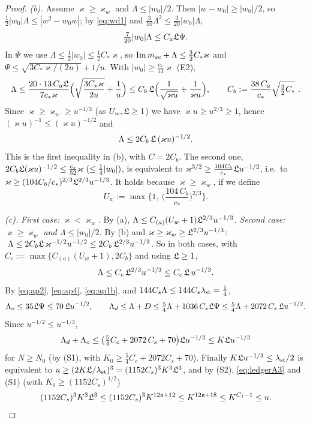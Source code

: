 \begin{proof}
\emph{(b).} Assume $\varkappa\ge\varkappa_w$ and $\Lambda\le|w_0|/2$. Then $|w-w_0|\ge|w_0|/2$, so $\frac12|w_0|\Lambda\le|w^2-w_0w|$; by \eqref{eq:wd1} and $\frac3{10}\Lambda^2\le\frac3{20}|w_0|\Lambda$,
\[
 \tfrac7{20}|w_0|\Lambda\le C_a\mathfrak{L}\Psi .
\]
In $\Psi$ we use $\Lambda\le\frac12|w_0|\le\frac12C_*\varkappa$, so $\operatorname{Im}m_{sc}+\Lambda\le\frac32C_*\varkappa$ and $\Psi\le\sqrt{3C_*\varkappa/(2u)}+1/u$. With $|w_0|\ge\frac{c_*}{13}\varkappa$ (E2),
\[
 \Lambda\le\frac{20\cdot13\,C_a\mathfrak{L}}{7c_*\varkappa}\Big(\sqrt{\frac{3C_*\varkappa}{2u}}+\frac1u\Big)\le C_b\,\mathfrak{L}\Big(\frac1{\sqrt{\varkappa u}}+\frac1{\varkappa u}\Big),\qquad C_b:=\frac{38\,C_a}{c_*}\sqrt{\tfrac32C_*}\ .
\]
Since $\varkappa\ge\varkappa_w\ge u^{-1/3}$ (as $U_w,\mathfrak{L}\ge1$) we have $\varkappa u\ge u^{2/3}\ge1$, hence $(\varkappa u)^{-1}\le(\varkappa u)^{-1/2}$ and
\[
 \Lambda\le2C_b\,\mathfrak{L}\,(\varkappa u)^{-1/2}.
\]
This is the first inequality in (b), with $C=2C_b$. The second one, $2C_b\mathfrak{L}(\varkappa u)^{-1/2}\le\frac{c_*}{52}\varkappa\ (\le\frac14|w_0|)$, is equivalent to $\varkappa^{3/2}\ge\frac{104C_b}{c_*}\mathfrak{L} u^{-1/2}$, i.e.\ to
$\varkappa\ge(104C_b/c_*)^{2/3}\mathfrak{L}^{2/3}u^{-1/3}$. It holds because $\varkappa\ge\varkappa_w$, if we define
\[
 U_w:=\max\Big\{1,\ \Big(\frac{104\,C_b}{c_*}\Big)^{2/3}\Big\}.
\]

\emph{(c).} \emph{First case: $\varkappa<\varkappa_w$.} By (a), $\Lambda\le C_{(a)}(U_w+1)\mathfrak{L}^{2/3}u^{-1/3}$.
\emph{Second case: $\varkappa\ge\varkappa_w$ and $\Lambda\le|w_0|/2$.} By (b) and $\varkappa\ge\varkappa_w\ge\mathfrak{L}^{2/3}u^{-1/3}$: $\ \Lambda\le2C_b\fL\,\varkappa^{-1/2}u^{-1/2}\le2C_b\,\fL^{2/3}u^{-1/3}$.
So in both cases, with $C_c:=\max\{C_{(a)}(U_w+1),2C_b\}$ and using $\mathfrak{L}\ge1$,
\[
 \Lambda\le C_c\,\mathfrak{L}^{2/3}u^{-1/3}\le C_c\,\mathfrak{L}\,u^{-1/3}.
\]
By \eqref{eq:ap2}, \eqref{eq:ap4}, \eqref{eq:ap1b}, and $144C_s\Lambda\le144C_s\lambda_{\rm st}=\frac14$,
\[
 \Lambda_o\le35\mathfrak{L}\Psi\le70\,\mathfrak{L} u^{-1/2},\qquad\Lambda_d\le\Lambda+D\le\tfrac54\Lambda+1036\,C_s\mathfrak{L}\Psi\le\tfrac54\Lambda+2072\,C_s\,\mathfrak{L} u^{-1/2}.
\]
Since $u^{-1/2}\le u^{-1/3}$,
\[
 \Lambda_d+\Lambda_o\le\big(\tfrac54C_c+2072\,C_s+70\big)\mathfrak{L} u^{-1/3}\le K\mathfrak{L} u^{-1/3}
\]
for $N\ge N_0$ (by (S1), with $K_0\ge\frac54C_c+2072C_s+70$). Finally $K\mathfrak{L} u^{-1/3}\le\lambda_{\rm st}/2$ is equivalent to $u\ge(2K\mathfrak{L}/\lambda_{\rm st})^3=(1152C_s)^3K^3\mathfrak{L}^3$, and by (S2), \eqref{eq:ledgerA3} and (S1) (with $K_0\ge(1152C_s)^{1/2}$)
\[
 (1152C_s)^3K^3\mathfrak{L}^3\le(1152C_s)^3K^{12\mathfrak{a}+12}\le K^{12\mathfrak{a}+18}\le K^{C_1-1}\le u .\qedhere
\]
\end{proof}

